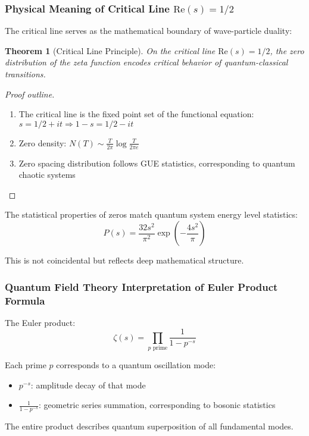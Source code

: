 \documentclass[11pt]{article}
\theoremstyle{plain}
\newtheorem{theorem}{Theorem}[section]
\theoremstyle{definition}
\theoremstyle{remark}
\begin{document}
\subsubsection{Physical Meaning of Critical Line $\text{Re}(s) = 1/2$}

The critical line serves as the mathematical boundary of wave-particle duality:

\begin{theorem}[Critical Line Principle]
On the critical line $\text{Re}(s) = 1/2$, the zero distribution of the zeta function encodes critical behavior of quantum-classical transitions.
\end{theorem}

\begin{proof}[Proof outline]
\begin{enumerate}
\item The critical line is the fixed point set of the functional equation: $s = 1/2 + it \Rightarrow 1-s = 1/2 - it$
\item Zero density: $N(T) \sim \frac{T}{2\pi} \log \frac{T}{2\pi e}$
\item Zero spacing distribution follows GUE statistics, corresponding to quantum chaotic systems
\end{enumerate}
\end{proof}

The statistical properties of zeros match quantum system energy level statistics:
$$P(s) = \frac{32s^2}{\pi^2} \exp\left(-\frac{4s^2}{\pi}\right)$$

This is not coincidental but reflects deep mathematical structure.

\subsubsection{Quantum Field Theory Interpretation of Euler Product Formula}

The Euler product:
$$\zeta(s) = \prod_{p \text{ prime}} \frac{1}{1 - p^{-s}}$$

Each prime $p$ corresponds to a quantum oscillation mode:
\begin{itemize}
\item $p^{-s}$: amplitude decay of that mode
\item $\frac{1}{1 - p^{-s}}$: geometric series summation, corresponding to bosonic statistics
\end{itemize}

The entire product describes quantum superposition of all fundamental modes.
\end{document}
